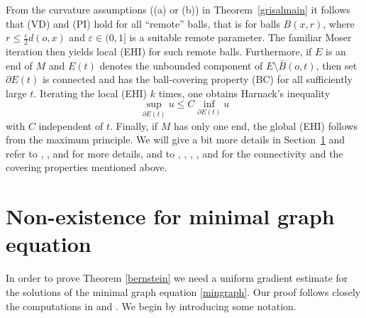 \documentclass[10pt,a4paper,reqno]{amsart}
\numberwithin{equation}{section}
\theoremstyle{plain}
\theoremstyle{definition}
\begin{document}
From the curvature assumptions ((a) or (b)) in Theorem~\ref{grisalmain} it follows that (VD) and (PI) hold for all ``remote''
balls, that is for balls $B(x,r)$, where $r\le\frac{\varepsilon}{2}d(o,x)$ and $\varepsilon\in (0,1]$ is a suitable remote parameter. The familiar Moser iteration then yields local (EHI) for such remote balls. Furthermore, if $E$ is an end of $M$ and $E(t)$ denotes the unbounded component of $E\setminus\bar{B}(o,t)$, then set $\partial E(t)$ is connected and has the ball-covering property (BC) for all sufficiently large $t$. Iterating the local (EHI)
$k$ times, one obtains Harnack's inequality 
\[
\sup_{\partial E(t)}u\le C\inf_{\partial E(t)}u
\] 
with $C$ independent of $t$. Finally, if $M$ has only one end, the global (EHI) follows from the maximum principle. We will give a bit more details in 
Section~\ref{sec-nonexist} and refer to 
\cite{grisal}, \cite{litam}, and \cite{holDuke} for more details, and to \cite{Ab}, \cite{Cai}, \cite{kas}, \cite{litam}, and \cite{liu}
for the connectivity and the covering properties mentioned above.


\section{Non-existence for minimal graph equation}\label{sec-nonexist}

In order to prove Theorem \ref{bernstein} we need a uniform gradient estimate for the 
solutions of the minimal graph equation \eqref{mingraph}. Our proof follows closely the 
computations in \cite{DL} and \cite{RSS}. We begin by introducing some notation.
\end{document}
